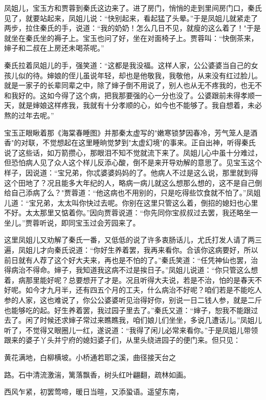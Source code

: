 凤姐儿，宝玉方和贾蓉到秦氏这边来了。进了房门，悄悄的走到里间房门口，秦氏见了，就要站起来，凤姐儿说：“快别起来，看起猛了头晕。”于是凤姐儿就紧走了两步，拉住秦氏的手，说道：“我的奶奶！怎么几日不见，就瘦的这么着了！"于是就坐在秦氏坐的褥子上。宝玉也问了好，坐在对面椅子上。贾蓉叫：“快倒茶来，婶子和二叔在上房还未喝茶呢。”

秦氏拉着凤姐儿的手，强笑道：“这都是我没福。这样人家，公公婆婆当自己的女孩儿似的待。婶娘的侄儿虽说年轻，却也是他敬我，我敬他，从来没有红过脸儿。就是一家子的长辈同辈之中，除了婶子倒不用说了，别人也从无不疼我的，也无不和我好的。这如今得了这个病，把我那要强的心一分也没了。公婆跟前未得孝顺一天，就是婶娘这样疼我，我就有十分孝顺的心，如今也不能够了。我自想着，未必熬的过年去呢。”

宝玉正眼瞅着那《海棠春睡图》并那秦太虚写的"嫩寒锁梦因春冷，芳气笼人是酒香"的对联，不觉想起在这里睡晌觉梦到"太虚幻境"的事来。正自出神，听得秦氏说了这些话，如万箭攒心，那眼泪不知不觉就流下来了。凤姐儿心中虽十分难过，但恐怕病人见了众人这个样儿反添心酸，倒不是来开导劝解的意思了。见宝玉这个样子，因说道：“宝兄弟，你忒婆婆妈妈的了。他病人不过是这么说，那里就到得这个田地了？况且能多大年纪的人，略病一病儿就这么想那么想的，这不是自己倒给自己添病了么？"贾蓉道：“他这病也不用别的，只是吃得些饮食就不怕了。”凤姐儿道：“宝兄弟，太太叫你快过去呢。你别在这里只管这么着，倒招的媳妇也心里不好。太太那里又惦着你。”因向贾蓉说道：“你先同你宝叔叔过去罢，我还略坐一坐儿。”贾蓉听说，即同宝玉过会芳园来了。

这里凤姐儿又劝解了秦氏一番，又低低的说了许多衷肠话儿，尤氏打发人请了两三遍，凤姐儿才向秦氏说道：“你好生养着罢，我再来看你。合该你这病要好，所以前日就有人荐了这个好大夫来，再也是不怕的了。”秦氏笑道：“任凭神仙也罢，治得病治不得命。婶子，我知道我这病不过是挨日子。”凤姐儿说道：“你只管这么想着，病那里能好呢？总要想开了才是。况且听得大夫说，若是不治，怕的是春天不好呢。如今才九月半，还有四五个月的工夫，什么病治不好呢？咱们若是不能吃人参的人家，这也难说了，你公公婆婆听见治得好你，别说一日二钱人参，就是二斤也能够吃的起。好生养着罢，我过园子里去了。”秦氏又道：“婶子，恕我不能跟过去了。闲了时候还求婶子常过来瞧瞧我，咱们娘儿们坐坐，多说几遭话儿。”凤姐儿听了，不觉得又眼圈儿一红，遂说道：“我得了闲儿必常来看你。”于是凤姐儿带领跟来的婆子丫头并宁府的媳妇婆子们，从里头绕进园子的便门来。但只见：

黄花满地，白柳横坡。小桥通若耶之溪，曲径接天台之

路。石中清流激湍，篱落飘香，树头红叶翩翻，疏林如画。

西风乍紧，初罢莺啼，暖日当暄，又添蛩语。遥望东南，

